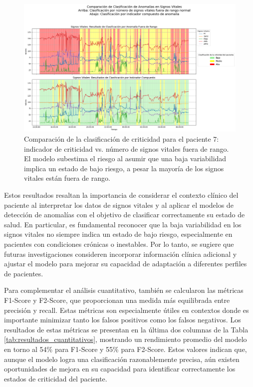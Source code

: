 \begin{figure}[H]
  \centering
  \includegraphics[width=\textwidth]{Images/comparacion_indicador_con_fuera_de_rango_paciente_7.png}
  \caption{Comparación de la clasificación de criticidad para el paciente 7: indicador de criticidad vs. número de signos vitales fuera de rango. El modelo subestima el riesgo al asumir que una baja variabilidad implica un estado de bajo riesgo, a pesar la mayoría de los signos vitales están fuera de rango.}

  \label{fig:comparacion_clasificacion_paciente7}
\end{figure}

Estos resultados resaltan la importancia de considerar el contexto clínico del paciente al interpretar los datos de signos vitales y al aplicar el modelos de detección de anomalías con el objetivo de clasificar correctamente su estado de salud. En particular, es fundamental reconocer que la baja variabilidad en los signos vitales no siempre indica un estado de bajo riesgo, especialmente en pacientes con condiciones crónicas o inestables. Por lo tanto, se sugiere que futuras investigaciones consideren incorporar información clínica adicional y ajustar el modelo para mejorar su capacidad de adaptación a diferentes perfiles de pacientes.

Para complementar el análisis cuantitativo, también se calcularon las métricas F1-Score y F2-Score, que proporcionan una medida más equilibrada entre precisión y recall. Estas métricas son especialmente útiles en contextos donde es importante minimizar tanto los falsos positivos como los falsos negativos. Los resultados de estas métricas se presentan en la última dos columnas de la Tabla \ref{tab:resultados_cuantitativos}, mostrando un rendimiento promedio del modelo en torno al 54\% para F1-Score y 55\% para F2-Score. Estos valores indican que, aunque el modelo logra una clasificación razonablemente precisa, aún existen oportunidades de mejora en su capacidad para identificar correctamente los estados de criticidad del paciente.

